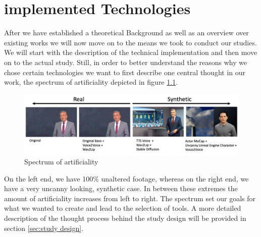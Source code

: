 \documentclass[
  a4paper,  %
  twoside,  %
  bibliography=totoc,
  headsepline,
  cleardoublepage=empty,
  parskip=half,
  draft=false
]{scrbook}
\begin{document}
\chapter{implemented Technologies}
\label{chap:implementation}

After we have established a theoretical Background as well as an overview over existing works we will now move on to the means we took to conduct our studies. We will start with the description of the technical implementation and then move on to the actual study. Still, in order to better understand the reasons why we chose certain technologies we want to first describe one central thought in our work, the spectrum of artificiality depicted in figure \ref{fig:spectrum}.
\begin{figure}[h]
  \centering
  \includegraphics[width=1\textwidth]{./graphics/images/spectrum-art.png}
  \caption{Spectrum of artificiality}
  \label{fig:spectrum}
\end{figure}
On the left end, we have 100\% unaltered footage, whereas on the right end, we have a very uncanny looking, synthetic case. In between these extremes the amount of artificiality increases from left to right. The spectrum set our goals for what we wanted to create and lead to the selection of tools. A more detailed description of the thought process behind the study design will be provided in section \ref{sec:study design}.
\end{document}
